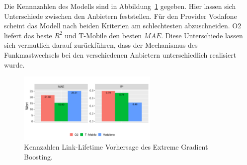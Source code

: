 Die Kennnzahlen des Modells sind in Abbildung~\ref{fig:kennzahlen-link-lifetime} gegeben.
Hier lassen sich Unterschiede zwischen den Anbietern feststellen. F\"ur den Provider Vodafone scheint das Modell nach beiden
Kriterien am schlechtesten abzuschneiden. O2 liefert das beste $R^2$ und T-Mobile den besten $MAE$.
Diese Unterschiede lassen sich vermutlich darauf zur\"uckf\"uhren, dass der Mechanismus des Funkmastwechsels bei den verschiedenen
Anbietern unterschiedlich realisiert wurde.
\begin{figure}
    \centering
    \includegraphics[width=0.6\textwidth]{abbildungen/kennzahlen_linklifetime}
    \caption{Kennzahlen Link-Lifetime Vorhersage des Extreme Gradient Boosting.}
    \label{fig:kennzahlen-link-lifetime}
\end{figure}

